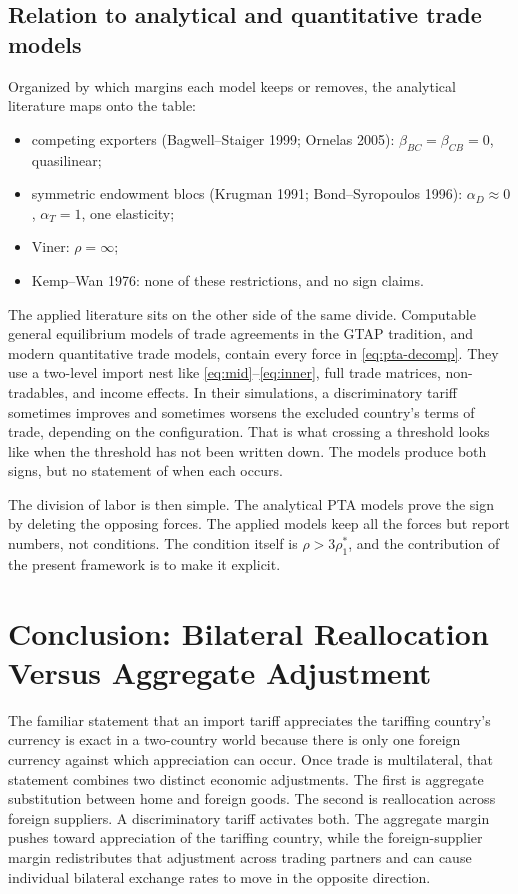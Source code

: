 \documentclass[11pt]{article}
\begin{document}
\subsection{Relation to analytical and quantitative trade models}

Organized by which margins each model keeps or removes, the analytical literature maps onto the table:
\begin{itemize}
\item competing exporters (Bagwell--Staiger 1999; Ornelas 2005): $\beta_{BC} = \beta_{CB} = 0$, quasilinear;
\item symmetric endowment blocs (Krugman 1991; Bond--Syropoulos 1996): $\alpha_D \approx 0$, $\alpha_T = 1$, one elasticity;
\item Viner: $\rho = \infty$;
\item Kemp--Wan 1976: none of these restrictions, and no sign claims.
\end{itemize}

The applied literature sits on the other side of the same divide. Computable general equilibrium models of trade agreements in the GTAP tradition, and modern quantitative trade models, contain every force in \eqref{eq:pta-decomp}. They use a two-level import nest like \eqref{eq:mid}--\eqref{eq:inner}, full trade matrices, non-tradables, and income effects. In their simulations, a discriminatory tariff sometimes improves and sometimes worsens the excluded country's terms of trade, depending on the configuration. That is what crossing a threshold looks like when the threshold has not been written down. The models produce both signs, but no statement of when each occurs.

The division of labor is then simple. The analytical PTA models prove the sign by deleting the opposing forces. The applied models keep all the forces but report numbers, not conditions. The condition itself is $\rho > 3\rho_1^*$, and the contribution of the present framework is to make it explicit.

\section{Conclusion: Bilateral Reallocation Versus Aggregate Adjustment}

The familiar statement that an import tariff appreciates the tariffing country's currency is exact in a two-country world because there is only one foreign currency against which appreciation can occur. Once trade is multilateral, that statement combines two distinct economic adjustments. The first is aggregate substitution between home and foreign goods. The second is reallocation across foreign suppliers. A discriminatory tariff activates both. The aggregate margin pushes toward appreciation of the tariffing country, while the foreign-supplier margin redistributes that adjustment across trading partners and can cause individual bilateral exchange rates to move in the opposite direction.
\end{document}
